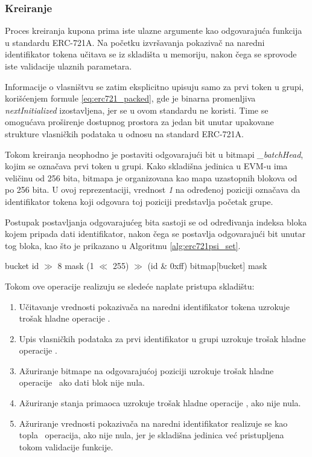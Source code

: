 \subsubsection{Kreiranje}
Proces kreiranja kupona prima iste ulazne argumente kao odgovarajuća funkcija u standardu ERC-721A. Na početku izvršavanja pokazivač na naredni identifikator tokena učitava se iz skladišta u memoriju, nakon čega se sprovode iste validacije ulaznih parametara.

Informacije o vlasništvu se zatim eksplicitno upisuju samo za prvi token u grupi, korišćenjem formule \ref{eq:erc721_packed}, gde je binarna promenljiva \textit{nextInitialized} izostavljena, jer se u ovom standardu ne koristi. Time se omogućava proširenje dostupnog prostora za jedan bit unutar upakovane strukture vlasničkih podataka u odnosu na standard ERC-721A.

Tokom kreiranja neophodno je postaviti odgovarajući bit u bitmapi \textit{\_batchHead}, kojim se označava prvi token u grupi. Kako skladišna jedinica u EVM-u ima veličinu od 256 bita, bitmapa je organizovana kao mapa uzastopnih blokova  od po 256 bita. U ovoj reprezentaciji, vrednost \textit{1} na određenoj poziciji označava da identifikator tokena koji odgovara toj poziciji predstavlja početak grupe. 

Postupak postavljanja odgovarajućeg bita sastoji se od određivanja indeksa bloka kojem pripada dati identifikator, nakon čega se postavlja odgovarajući bit unutar tog bloka, kao što je prikazano u Algoritmu \ref{alg:erc721psi_set}.

\begin{algorithm}
\caption{Postavljanje prvog u grupi u bitmapi standarda ERC-721Psi}
\label{alg:erc721psi_set}
\begin{algorithmic}[1]
    \State bucket \Eq id $\gg$ 8
    \State mask \Eq (1 $\ll$ 255) $\gg$ (id \& 0xff)
    \State bitmap[bucket] \OrEq mask
\EndFunction
\end{algorithmic}
\end{algorithm}

Tokom ove operacije realizuju se sledeće naplate pristupa skladištu:
\begin{enumerate}
\item Učitavanje vrednosti pokazivača na naredni identifikator tokena uzrokuje trošak hladne operacije \Sl.
\item Upis vlasničkih podataka za prvi identifikator u grupi uzrokuje trošak hladne operacije \Sj.
\item Ažuriranje bitmape na odgovarajućoj poziciji uzrokuje trošak hladne operacije \Sd\ ako dati blok nije nula.
\item Ažuriranje stanja primaoca uzrokuje trošak hladne operacije \Sd, ako nije nula.
\item Ažuriranje vrednosti pokazivača na naredni identifikator realizuje se kao topla \Sd\ operacija, ako nije nula, jer je skladišna jedinica već pristupljena tokom validacije funkcije.
\end{enumerate}

